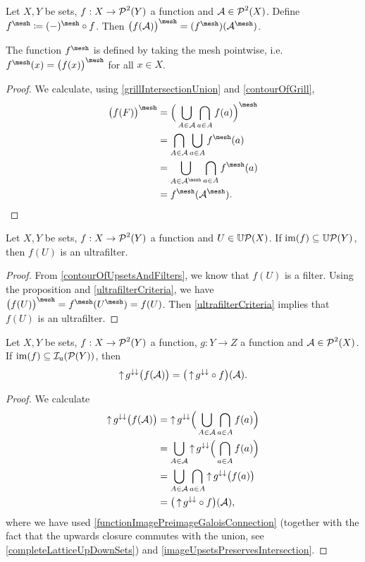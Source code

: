 \begin{proposition} \label{grillOfContour}
Let $X, Y$ be sets, $f: X\to \operatorname{\mathcal{P}}^2(Y)$ a function and $\mathcal{A} \in \operatorname{\mathcal{P}}^2(X)$. Define $f^\mesh \defeq (-)^\mesh\circ f$. Then $\big(f(\mathcal{A})\big)^\mesh = (f^\mesh)(\mathcal{A}^\mesh)$.
\end{proposition}
The function $f^\mesh$ is defined by taking the mesh pointwise, i.e.\ $f^\mesh(x) = \big(f(x)\big)^\mesh$ for all $x\in X$.
\begin{proof}
We calculate, using \ref{grillIntersectionUnion} and \ref{contourOfGrill},
\begin{align*}
\big(f(F)\big)^\mesh &= \Big(\bigcup_{A\in\mathcal{A}}\bigcap_{a\in A} f(a)\Big)^\mesh \\
&= \bigcap_{A\in\mathcal{A}}\bigcup_{a\in A} f^\mesh(a) \\
&= \bigcup_{A\in\mathcal{A}^\mesh}\bigcap_{a\in A} f^\mesh(a) \\
&= f^\mesh(\mathcal{A}^\mesh).
\end{align*}
\end{proof}
\begin{corollary}
Let $X,Y$ be sets, $f: X\to \operatorname{\mathcal{P}}^2(Y)$ a function and $U \in \operatorname{\mathbb{U}\mathcal{P}}(X)$. If $\operatorname{im}(f) \subseteq \operatorname{\mathbb{U}\mathcal{P}}(Y)$, then $f(U)$ is an ultrafilter.
\end{corollary}
\begin{proof}
From \ref{contourOfUpsetsAndFilters}, we know that $f(U)$ is a filter. Using the proposition and \ref{ultrafilterCriteria}, we have $\big(f(U)\big)^\mesh = f^\mesh(U^\mesh) = f(U)$. Then \ref{ultrafilterCriteria} implies that $f(U)$ is an ultrafilter.
\end{proof}

\begin{proposition} \label{imageContour}
Let $X,Y$ be sets, $f: X\to \operatorname{\mathcal{P}}^2(Y)$ a function, $g: Y\to Z$ a function and $\mathcal{A}\in \operatorname{\mathcal{P}}^2(X)$. If $\operatorname{im}(f) \subseteq \operatorname{\mathcal{I}_u}(\operatorname{\mathcal{P}}(Y))$, then
\[ \operatorname{\uparrow} g^{\downarrow\downarrow}\big(f(\mathcal{A})\big) = \big(\operatorname{\uparrow} g^{\downarrow\downarrow} \circ f\big)(\mathcal{A}). \]
\end{proposition}
\begin{proof}
We calculate
\begin{align*}
\operatorname{\uparrow} g^{\downarrow\downarrow}\big(f(\mathcal{A})\big) &= \operatorname{\uparrow} g^{\downarrow\downarrow}\Big(\bigcup_{A\in \mathcal{A}}\bigcap_{a\in A}f(a)\Big) \\
&= \bigcup_{A\in \mathcal{A}}\operatorname{\uparrow} g^{\downarrow\downarrow}\Big(\bigcap_{a\in A}f(a)\Big) \\
&= \bigcup_{A\in \mathcal{A}}\bigcap_{a\in A}\operatorname{\uparrow} g^{\downarrow\downarrow}\big(f(a)\big) \\
&= \big(\operatorname{\uparrow} g^{\downarrow\downarrow} \circ f\big)(\mathcal{A}),
\end{align*}
where we have used \ref{functionImagePreimageGaloisConnection} (together with the fact that the upwards closure commutes with the union, see \ref{completeLatticeUpDownSets}) and \ref{imageUpsetsPreservesIntersection}.
\end{proof}



